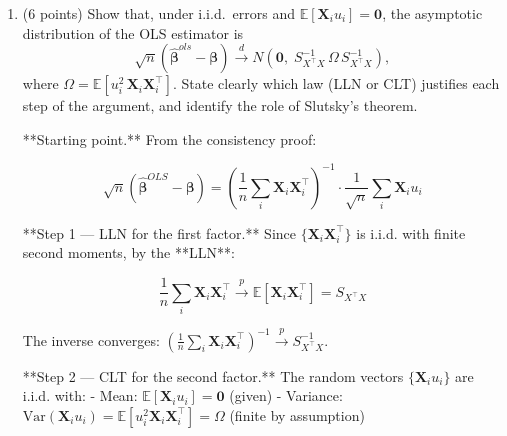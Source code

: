 \documentclass[letterpaper,12pt]{article}
\begin{document}
\begin{enumerate}[label=(\alph*)]
**Predeterminedness vs. Strict Exogeneity.** Strict exogeneity requires $\mathbb{E}[u_i \mid \mathbf{X}] = 0$ — i.e., the error of observation $i$ is mean-independent of the regressors of *all* observations. This ensures:

$$\mathbb{E}\left[\hat{\boldsymbol{\beta}}^{OLS} \mid \mathbf{X}\right] = \boldsymbol{\beta} + \left(\mathbf{X}^\top\mathbf{X}\right)^{-1}\mathbf{X}^\top \underbrace{\mathbb{E}[\mathbf{u}\mid\mathbf{X}]}_{=\mathbf{0}} = \boldsymbol{\beta}$$

so unbiasedness is an exact, finite-sample statement that requires conditioning on the *full* matrix $\mathbf{X}$.

Predeterminedness only requires $\mathbb{E}[u_i \mid \mathbf{X}_i] = 0$ — the error is mean-independent of *own* regressors. This is weaker. Predeterminedness gives $\mathbb{E}[\mathbf{X}_i u_i] = \mathbf{0}$, which is sufficient for the LLN to deliver $\frac{1}{n}\mathbf{X}^\top\mathbf{u} \xrightarrow{p} \mathbf{0}$ and hence consistency, but it does not pin down $\mathbb{E}[\mathbf{u}\mid\mathbf{X}]$, so unbiasedness fails.


\item (6 points) Show that, under i.i.d.\ errors and $\mathbb{E}[\mathbf{X}_i u_i]=\mathbf{0}$, the asymptotic distribution of the OLS estimator is
\[
\sqrt{n}\left(\hat{\boldsymbol{\beta}}^{ols}-\boldsymbol{\beta}\right)
\xrightarrow{d}
N\!\left(\mathbf{0},\; S_{X^\top X}^{-1}\,\Omega\, S_{X^\top X}^{-1}\right),
\]
where $\Omega = \mathbb{E}[u_i^2\, \mathbf{X}_i\mathbf{X}_i^\top]$. State clearly which law (LLN or CLT) justifies each step of the argument, and identify the role of Slutsky's theorem.

**Starting point.** From the consistency proof:

$$\sqrt{n}\left(\hat{\boldsymbol{\beta}}^{OLS} - \boldsymbol{\beta}\right) = \left(\frac{1}{n}\sum_i \mathbf{X}_i\mathbf{X}_i^\top\right)^{-1} \cdot \frac{1}{\sqrt{n}}\sum_i \mathbf{X}_i u_i$$

**Step 1 — LLN for the first factor.** Since $\{\mathbf{X}_i\mathbf{X}_i^\top\}$ is i.i.d. with finite second moments, by the **LLN**:

$$\frac{1}{n}\sum_i \mathbf{X}_i\mathbf{X}_i^\top \xrightarrow{p} \mathbb{E}[\mathbf{X}_i\mathbf{X}_i^\top] = S_{X^\top X}$$

The inverse converges: $\left(\frac{1}{n}\sum_i \mathbf{X}_i\mathbf{X}_i^\top\right)^{-1} \xrightarrow{p} S_{X^\top X}^{-1}$.

**Step 2 — CLT for the second factor.** The random vectors $\{\mathbf{X}_i u_i\}$ are i.i.d. with:
- Mean: $\mathbb{E}[\mathbf{X}_i u_i] = \mathbf{0}$ (given)
- Variance: $\mathrm{Var}(\mathbf{X}_i u_i) = \mathbb{E}[u_i^2 \mathbf{X}_i\mathbf{X}_i^\top] = \Omega$ (finite by assumption)


\end{enumerate}
\end{document}
